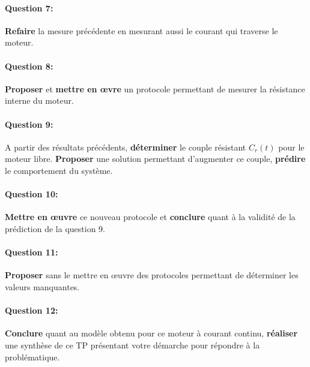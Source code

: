 \paragraph{Question 7:} \textbf{Refaire} la mesure précédente en mesurant aussi le courant qui traverse le moteur.

\paragraph{Question 8:} \textbf{Proposer} et \textbf{mettre en \oe vre} un protocole permettant de mesurer la résistance interne du moteur.


\paragraph{Question 9:} A partir des résultats précédents, \textbf{déterminer} le couple résistant $C_r(t)$ pour le moteur libre. \textbf{Proposer} une solution permettant d'augmenter ce couple, \textbf{prédire} le comportement du système.


\paragraph{Question 10:} \textbf{Mettre en \oe uvre} ce nouveau protocole et \textbf{conclure} quant à la validité de la prédiction de la question 9.


\paragraph{Question 11:} \textbf{Proposer} sans le mettre en \oe uvre des protocoles permettant de déterminer les valeurs manquantes.


\paragraph{Question 12:} \textbf{Conclure} quant au modèle obtenu pour ce moteur à courant continu, \textbf{réaliser} une synthèse de ce TP présentant votre démarche pour répondre à la problématique.

\ifdef{\public}{}{}

\clearpage

